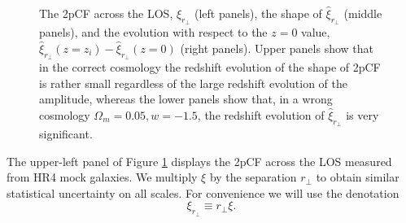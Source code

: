 \documentclass[iop]{emulateapj}
\begin{document}
\begin{figure}
   \caption{\label{fig_diffz}
  The 2pCF across the LOS, $\xi_{r_\perp}$ (left panels), the shape of $\hat{\xi}_{r_\perp}$ (middle panels),
  and the evolution with respect to the $z=0$ value, $\hat{\xi}_{r_{\perp}}(z=z_i) - \hat{\xi}_{r_{\perp}}(z=0)$ (right panels). 
  Upper panels show that in the correct cosmology the redshift evolution of the shape of 2pCF is rather small regardless of the large redshift evolution of the amplitude, 
  whereas the lower panels show that, in a wrong cosmology $\Omega_m = 0.05,w=-1.5$, the redshift evolution of $\hat{\xi}_{r_\perp}$ is very significant.
   }
\end{figure}

The upper-left panel of Figure \ref{fig_diffz} displays the 2pCF across the LOS measured from HR4 mock galaxies. %
We multiply $\xi$ by the separation $r_\perp$ to obtain similar statistical uncertainty on all scales.
For convenience we will use the denotation
\begin{equation}
 \xi_{r_{\perp}} \equiv r_{\perp} \xi.
\end{equation}
\end{document}
